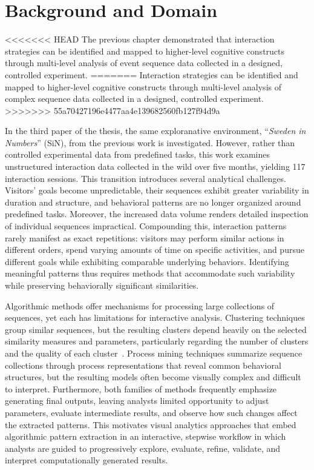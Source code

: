 \section{Background and Domain}

<<<<<<< HEAD
The previous chapter demonstrated that interaction strategies can be identified and mapped to higher-level cognitive constructs through multi-level analysis of event sequence data collected in a designed, controlled experiment.
=======
Interaction strategies can be identified and mapped to higher-level cognitive constructs through multi-level analysis of complex sequence data collected in a designed, controlled experiment.
>>>>>>> 55a70427196e4477aa4e139682560fb127f94d9a

In the third paper of the thesis, the same exploranative environment, ``\textit{Sweden in Numbers}'' (SiN), from the previous work is investigated.
However, rather than controlled experimental data from predefined tasks, this work examines unstructured interaction data collected in the wild over five months, yielding 117 interaction sessions.
This transition introduces several analytical challenges.
Visitors' goals become unpredictable, their sequences exhibit greater variability in duration and structure, and behavioral patterns are no longer organized around predefined tasks.
Moreover, the increased data volume renders detailed inspection of individual sequences impractical.
Compounding this, interaction patterns rarely manifest as exact repetitions: visitors may perform similar actions in different orders, spend varying amounts of time on specific activities, and pursue different goals while exhibiting comparable underlying behaviors.
Identifying meaningful patterns thus requires methods that accommodate such variability while preserving behaviorally significant similarities.

Algorithmic methods offer mechanisms for processing large collections of sequences, yet each has limitations for interactive analysis.
Clustering techniques group similar sequences, but the resulting clusters depend heavily on the selected similarity measures and parameters, particularly regarding the number of clusters and the quality of each cluster~\cite{ali2019clustering, everitt2011cluster, estivillcastro2002why}.
Process mining techniques summarize sequence collections through process representations that reveal common behavioral structures, but the resulting models often become visually complex and difficult to interpret.
Furthermore, both families of methods frequently emphasize generating final outputs, leaving analysts limited opportunity to adjust parameters, evaluate intermediate results, and observe how such changes affect the extracted patterns.
This motivates visual analytics approaches that embed algorithmic pattern extraction in an interactive, stepwise workflow in which analysts are guided to progressively explore, evaluate, refine, validate, and interpret computationally generated results.

